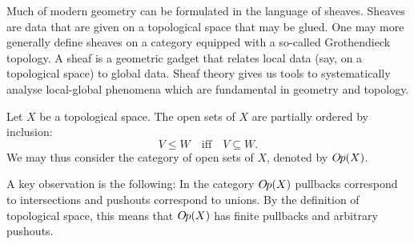 Much of modern geometry can be formulated in the language of sheaves. Sheaves are data that are given on a topological space that may be glued. One may more generally define sheaves on a category equipped with a so-called Grothendieck topology. A sheaf is a geometric gadget that relates local data (say, on a topological space) to global data. Sheaf theory gives us tools to systematically analyse local-global phenomena which are fundamental in geometry and topology.

\begin{construction}\label{def:opens}
  Let $X$ be a topological space. The open sets of $X$ are partially ordered by inclusion: \[V \le W \quad \text{iff} \quad V \subseteq W.\]
  We may thus consider the category of open sets of $X$, denoted by $O\kern-0.10em p(X)$.
\end{construction}
A key observation is the following: In the category $O\kern-0.10em p(X)$ pullbacks correspond to intersections and pushouts correspond to unions. By the definition of topological space, this means that $O\kern-0.10em p(X)$ has finite pullbacks and arbitrary pushouts.


